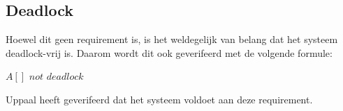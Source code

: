 \documentclass{article} %
\begin{document}
\subsection{Deadlock}

Hoewel dit geen requirement is, is het weldegelijk van belang dat het systeem deadlock-vrij is. Daarom wordt dit ook geverifeerd met de volgende formule:

\begin{boxA}
    $A[]$ $not$ $deadlock$
\end{boxA}

Uppaal heeft geverifeerd dat het systeem voldoet aan deze requirement.

\newpage

\printbibliography
\end{document}
